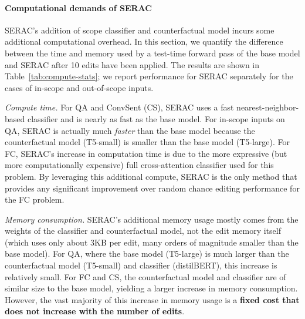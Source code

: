 \documentclass{article}
\newcommand{\name}{SERAC}
\begin{document}
\paragraph{Computational demands of {\name}}

{\name}'s addition of scope classifier and counterfactual model incurs some additional computational overhead. In this section, we quantify the difference between the time and memory used by a test-time forward pass of the base model and {\name} after 10 edits have been applied. The results are shown in Table~\ref{tab:compute-stats}; we report performance for {\name} separately for the cases of in-scope and out-of-scope inputs.

\textit{Compute time.} For QA and ConvSent (CS), SERAC uses a fast nearest-neighbor-based classifier and is nearly as fast as the base model. For in-scope inputs on QA, SERAC is actually much \textit{faster} than the base model because the counterfactual model (T5-small) is smaller than the base model (T5-large). For FC, SERAC's increase in computation time is due to the more expressive (but more computationally expensive) full cross-attention classifier used for this problem. By leveraging this additional compute, SERAC is the only method that provides any significant improvement over random chance editing performance for the FC problem. 

\textit{Memory consumption.} SERAC's additional memory usage mostly comes from the weights of the classifier and counterfactual model, not the edit memory itself (which uses only about 3KB per edit, many orders of magnitude smaller than the base model). For QA, where the base model (T5-large) is much larger than the counterfactual model (T5-small) and classifier (distilBERT), this increase is relatively small. For FC and CS, the counterfactual model and classifier are of similar size to the base model, yielding a larger increase in memory consumption. However, the vast majority of this increase in memory usage is a \textbf{fixed cost that does not increase with the number of edits}.
\end{document}
